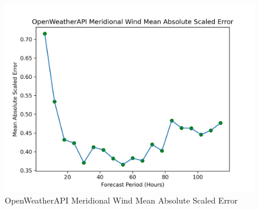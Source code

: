 \begin{appendices}
    \begin{figure}[H]
        \centering
        \includegraphics[width=.7\linewidth]{Graphs/accuracy/appendices/openweatherapi/meridional_wind/mean_absolute_scaled_error.png}
        \caption{OpenWeatherAPI Meridional Wind Mean Absolute Scaled Error}
    \end{figure}
    
    \clearpage
    
\end{appendices}